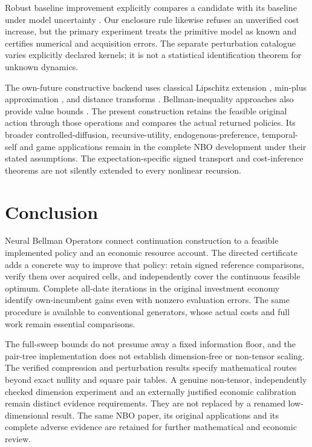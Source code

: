 \documentclass[ecta,nameyear,draft]{econsocart}
\begin{document}
Robust baseline improvement explicitly compares a candidate with its baseline under model uncertainty \citep{ghavamzadeh2016}. Our enclosure rule likewise refuses an unverified cost increase, but the primary experiment treats the primitive model as known and certifies numerical and acquisition errors. The separate perturbation catalogue varies explicitly declared kernels; it is not a statistical identification theorem for unknown dynamics.

The own-future constructive backend uses classical Lipschitz extension \citep{mcshane1934}, min-plus approximation \citep{lakshminarayanan2014}, and distance transforms \citep{felzenszwalb2012}. Bellman-inequality approaches also provide value bounds \citep{wang2015}. The present construction retains the feasible original action through those operations and compares the actual returned policies. Its broader controlled-diffusion, recursive-utility, endogenous-preference, temporal-self and game applications remain in the complete NBO development under their stated assumptions. The expectation-specific signed transport and cost-inference theorems are not silently extended to every nonlinear recursion.







\section{Conclusion}\label{sec:conclusion53}
Neural Bellman Operators connect continuation construction to a feasible implemented policy and an economic resource account. The directed certificate adds a concrete way to improve that policy: retain signed reference comparisons, verify them over acquired cells, and independently cover the continuous feasible optimum. Complete all-date iterations in the original investment economy identify own-incumbent gains even with nonzero evaluation errors. The same procedure is available to conventional generators, whose actual costs and full work remain essential comparisons.

The full-sweep bounds do not presume away a fixed information floor, and the pair-tree implementation does not establish dimension-free or non-tensor scaling. The verified compression and perturbation results specify mathematical routes beyond exact nullity and square pair tables. A genuine non-tensor, independently checked dimension experiment and an externally justified economic calibration remain distinct evidence requirements. They are not replaced by a renamed low-dimensional result. The same NBO paper, its original applications and its complete adverse evidence are retained for further mathematical and economic review.
\end{document}
